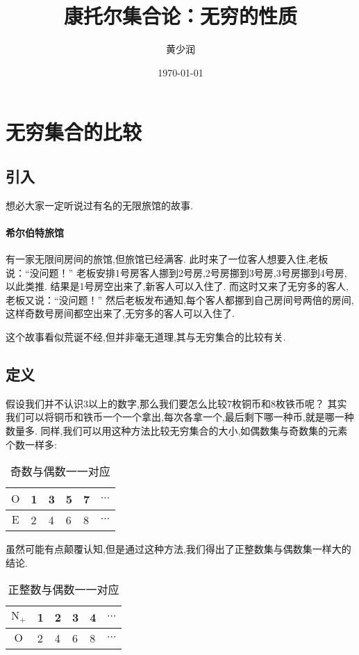 \documentclass[UTF8]{mathrep}
\title{康托尔集合论：无穷的性质}
\date{\today}
\author{黄少润}
\begin{document}
\maketitle
\tableofcontents

\section{无穷集合的比较}
\subsection{引入}
想必大家一定听说过有名的无限旅馆的故事.

\paragraph{希尔伯特旅馆}
有一家无限间房间的旅馆,但旅馆已经满客.
此时来了一位客人想要入住,老板说：“没问题！”
老板安排1号房客人挪到2号房,2号房挪到3号房,3号房挪到4号房,以此类推.
结果是1号房空出来了,新客人可以入住了.
而这时又来了无穷多的客人,老板又说：“没问题！”
然后老板发布通知,每个客人都挪到自己房间号两倍的房间,这样奇数号房间都空出来了,无穷多的客人可以入住了.

这个故事看似荒诞不经,但并非毫无道理,其与无穷集合的比较有关.

\subsection{定义}
\label{defi}
假设我们并不认识$3$以上的数字,那么我们要怎么比较$7$枚铜币和$8$枚铁币呢？
其实我们可以将铜币和铁币一个一个拿出,每次各拿一个,最后剩下哪一种币,就是哪一种数量多.
同样,我们可以用这种方法比较无穷集合的大小,如偶数集与奇数集的元素个数一样多:
\begin{table}[!ht]
	\begin{center}
		\begin{tabular}{c|lllll}
			\toprule
			$\mathrm O$ & 1 & 3 & 5 & 7 & $\cdots$ \\
			\midrule
			$\mathrm E$ & 2 & 4 & 6 & 8 & $\cdots$ \\
			\bottomrule
		\end{tabular}
		\caption{奇数与偶数一一对应}
	\end{center}
\end{table}

虽然可能有点颠覆认知,但是通过这种方法,我们得出了正整数集与偶数集一样大的结论.

\begin{table}[!h]
	\begin{center}
		\begin{tabular}{c|lllll}
			\toprule
			$\mathrm N_+$ & 1 & 2 & 3 & 4 & $\cdots$ \\
			\midrule
			$\mathrm O$   & 2 & 4 & 6 & 8 & $\cdots$ \\
			\bottomrule
		\end{tabular}
		\caption{正整数与偶数一一对应}
	\end{center}
\end{table}
\end{document}
